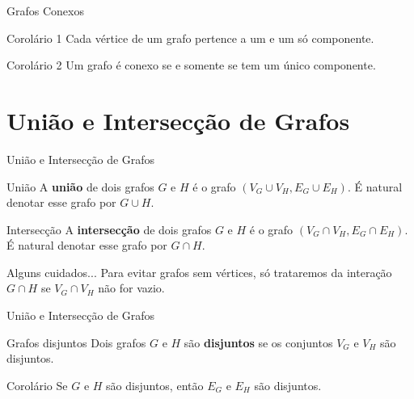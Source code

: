 \documentclass[xcolor=dvipsnames,table]{beamer}
\begin{document}
	\begin{frame}{Grafos Conexos}
		\begin{block}{Corolário 1}
			Cada vértice de um grafo pertence a um e um só componente.
		\end{block}
		\begin{block}{Corolário 2}
			 Um grafo é conexo se e somente se tem um único componente.
		\end{block}
	\end{frame}
	
	\section{União e Intersecção de Grafos}
	\begin{frame}{União e Intersecção de Grafos}
		\begin{block}{União}
			A {\bf união} de dois grafos $G$ e $H$ é o grafo $(V_G \cup V_H, E_G \cup E_H)$. É natural denotar esse grafo por $G \cup H$.
		\end{block} \pause
		\begin{block}{Intersecção}
			A {\bf intersecção} de dois grafos $G$ e $H$ é o grafo $(V_G \cap V_H, E_G \cap E_H)$. É natural denotar esse grafo por $G \cap H$.
		\end{block} \pause
		\begin{alertblock}{Alguns cuidados...}
			Para evitar grafos sem vértices, só trataremos da interação $G \cap H$ se $V_G \cap V_H$ não for vazio.
		\end{alertblock}
	\end{frame}
	
	\begin{frame}{União e Intersecção de Grafos}
		\begin{block}{Grafos disjuntos}
			Dois grafos $G$ e $H$ são {\bf disjuntos} se os conjuntos $V_G$ e $V_H$ são disjuntos.
		\end{block} \pause
		\begin{block}{Corolário}
		 	Se $G$ e $H$ são disjuntos, então $E_G$ e $E_H$ são disjuntos.
		\end{block}
	\end{frame}
	
\end{document}
